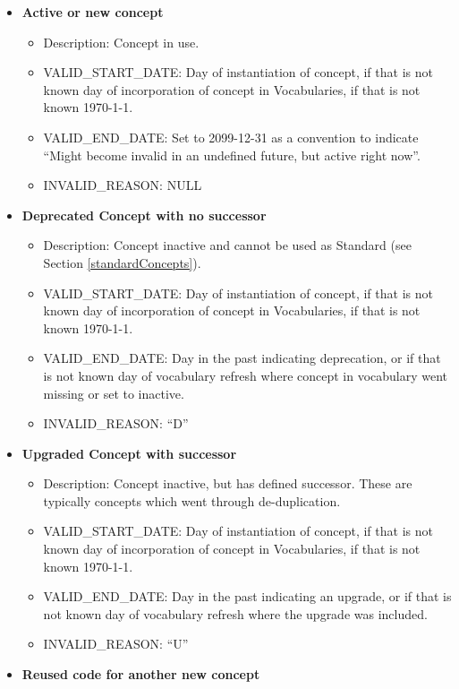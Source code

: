 \documentclass[11pt]{book}
\providecommand{\tightlist}{%
  \setlength{\itemsep}{0pt}\setlength{\parskip}{0pt}}
\theoremstyle{definition}
\theoremstyle{definition}
\theoremstyle{definition}
\theoremstyle{remark}
\begin{document}
\begin{itemize}
\tightlist
\item
  \textbf{Active or new concept}

  \begin{itemize}
  \tightlist
  \item
    Description: Concept in use.
  \item
    VALID\_START\_DATE: Day of instantiation of concept, if that is not
    known day of incorporation of concept in Vocabularies, if that is
    not known 1970-1-1.
  \item
    VALID\_END\_DATE: Set to 2099-12-31 as a convention to indicate
    ``Might become invalid in an undefined future, but active right
    now''.
  \item
    INVALID\_REASON: NULL
  \end{itemize}
\item
  \textbf{Deprecated Concept with no successor}

  \begin{itemize}
  \tightlist
  \item
    Description: Concept inactive and cannot be used as Standard (see
    Section \ref{standardConcepts}).
  \item
    VALID\_START\_DATE: Day of instantiation of concept, if that is not
    known day of incorporation of concept in Vocabularies, if that is
    not known 1970-1-1.
  \item
    VALID\_END\_DATE: Day in the past indicating deprecation, or if that
    is not known day of vocabulary refresh where concept in vocabulary
    went missing or set to inactive.
  \item
    INVALID\_REASON: ``D''
  \end{itemize}
\item
  \textbf{Upgraded Concept with successor}

  \begin{itemize}
  \tightlist
  \item
    Description: Concept inactive, but has defined successor. These are
    typically concepts which went through de-duplication.
  \item
    VALID\_START\_DATE: Day of instantiation of concept, if that is not
    known day of incorporation of concept in Vocabularies, if that is
    not known 1970-1-1.
  \item
    VALID\_END\_DATE: Day in the past indicating an upgrade, or if that
    is not known day of vocabulary refresh where the upgrade was
    included.
  \item
    INVALID\_REASON: ``U''
  \end{itemize}
\item
  \textbf{Reused code for another new concept}


\end{itemize}
\end{document}
